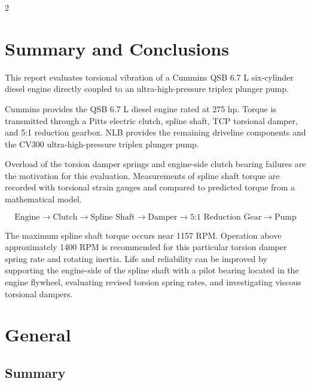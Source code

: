 \documentclass[
	a4paper,
]{CSMakotoTechnicalReport}
\begin{document}
\begin{multicols}{2}

\tableofcontents


\section{Summary and Conclusions}

This report evaluates torsional vibration of a Cummins QSB 6.7 L six-cylinder diesel engine directly coupled to an ultra-high-pressure triplex plunger pump.

Cummins provides the QSB 6.7 L diesel engine rated at 275 hp. Torque is transmitted through a Pitts electric clutch, spline shaft, TCP torsional damper, and 5:1 reduction gearbox. NLB provides the remaining driveline components and the CV300 ultra-high-pressure triplex plunger pump.

Overload of the torsion damper springs and engine-side clutch bearing failures are the motivation for this evaluation. Measurements of spline shaft torque are recorded with torsional strain gauges and compared to predicted torque from a mathematical model.

\[
\text{Engine}
\rightarrow
\text{Clutch}
\rightarrow
\text{Spline Shaft}
\rightarrow
\text{Damper}
\rightarrow
\text{5:1 Reduction Gear}
\rightarrow
\text{Pump}
\]

The maximum spline shaft torque occurs near 1157 RPM. Operation above approximately 1400 RPM is recommended for this particular torsion damper spring rate and rotating inertia. Life and reliability can be improved by supporting the engine-side of the spline shaft with a pilot bearing located in the engine flywheel, evaluating revised torsion spring rates, and investigating viscous torsional dampers.


\section{General}

\subsection{Summary}


\end{multicols}
\end{document}
